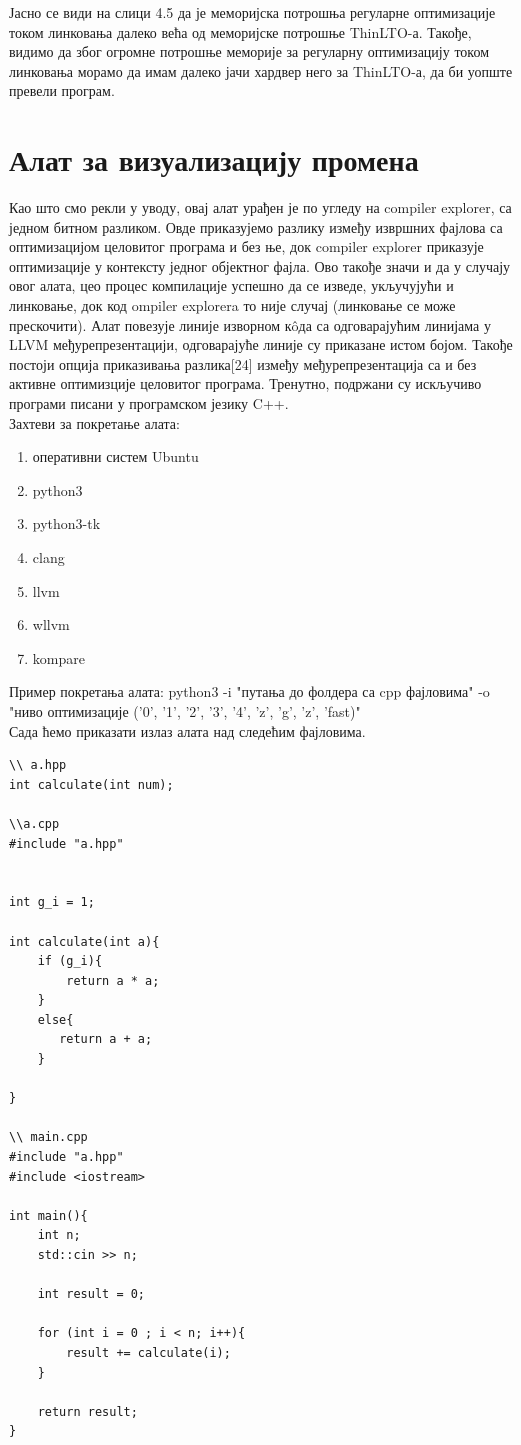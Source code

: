 \documentclass[12pt,oneside]{memoir}
\begin{document}
Јасно се види на слици 4.5 да је меморијска потрошња регуларне оптимизације
током линковања далеко већа од меморијске потрошње ThinLTO-а.
Такође, видимо да због огромне потрошње меморије за регуларну оптимизацију
током линковања морамо да имам далеко јачи хардвер него за  ThinLTO-а, да би уопште
превели програм.

\chapter{Алат за визуализацију промена}

Као што смо рекли у уводу, овај алат урађен је по угледу на compiler explorer,
са једном битном разликом.
Овде приказујемо разлику између извршних фајлова са оптимизацијом целовитог
програма и без ње, док compiler explorer приказује оптимизације у контексту
једног објектног фајла.
Ово такође значи и да у случају овог алата, цео процес компилације успешно да се
изведе, укључујући и линковање, док код ompiler explorera то није случај (линковање
се може прескочити).
Алат повезује линије изворном к\^{o}да са одговарајућим линијама у LLVM 
међурепрезентацији, одговарајуће линије су приказане истом бојом.
Такође постоји опција приказивања разлика[24] између међурепрезентација са и без
активне оптимизције целовитог програма.
Тренутно, подржани су искључиво програми писани у програмском језику C++.
\\
Захтеви за покретање алата:
\begin{enumerate}
\item оперативни систем Ubuntu
\item python3
\item python3-tk
\item clang
\item llvm
\item wllvm
\item kompare
\end{enumerate}

Пример покретања алата:
python3 -i "путања до фолдера са cpp фајловима"
-o "ниво оптимизације ('0', '1', '2', '3', '4', 'z', 'g', 'z', 'fast)"
\\
Сада ћемо приказати излаз алата над следећим фајловима.

\begin{lstlisting}
\\ a.hpp
int calculate(int num);

\\a.cpp
#include "a.hpp"


int g_i = 1;

int calculate(int a){
    if (g_i){
        return a * a;
    }
    else{
       return a + a;
    }
    
}

\\ main.cpp
#include "a.hpp"
#include <iostream>

int main(){
    int n;
    std::cin >> n;
    
    int result = 0;

    for (int i = 0 ; i < n; i++){
        result += calculate(i);
    }

    return result;
}

\end{lstlisting}
\end{document}
